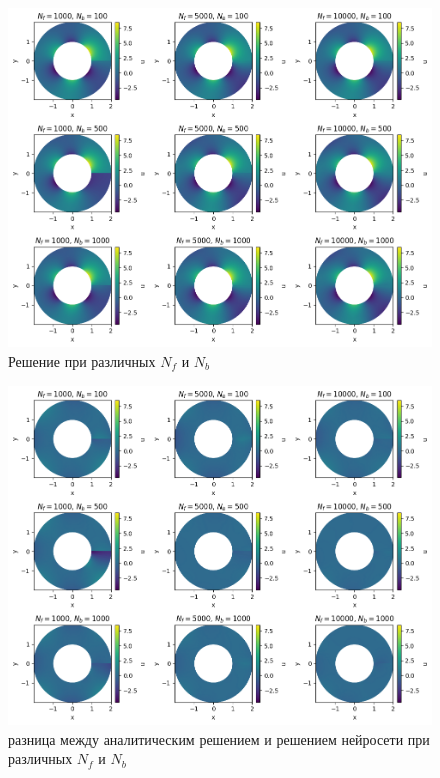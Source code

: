 \documentclass[a4paper,14pt]{extarticle} %
\begin{document}
\begin{figure}[ht]
    \center
    \includegraphics[width=\textwidth]{../plots/termal/solut l = (20x4) Nf=[1000, 5000, 10000] Nu=[100, 500, 1000].png}
    \caption{Решение при различных $N_f$ и $N_b$}
    \label{fig:termal_pred}
\end{figure}

\begin{figure}[ht]
    \center
    \includegraphics[width=\textwidth]{../plots/termal/solut dif l = (20x4) Nf=[1000, 5000, 10000] Nu=[100, 500, 1000].png}
    \caption{разница между аналитическим решением и решением нейросети при различных $N_f$ и $N_b$}
    \label{fig:termal_dif}
\end{figure}
\end{document}
